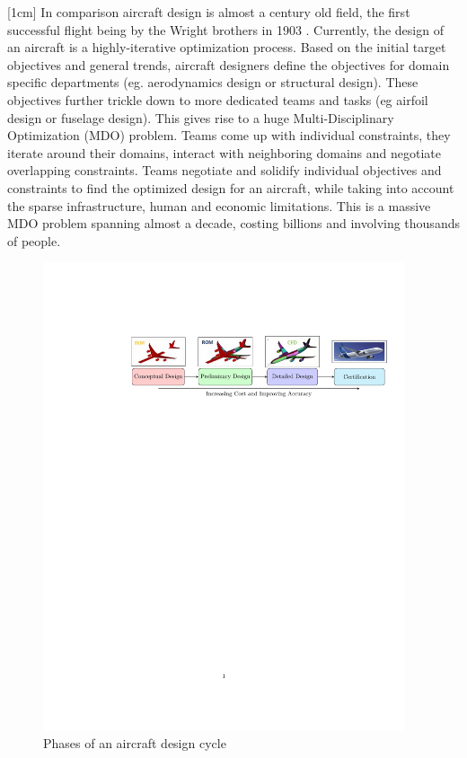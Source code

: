 [1cm]
In comparison aircraft design is almost a century old field, the first successful flight being by the Wright brothers in 1903 \cite{wright1934we}. Currently, the design of an aircraft is a highly-iterative optimization process. Based on the initial target objectives and general trends, aircraft designers define the objectives for domain specific departments (eg. aerodynamics design or structural design). These objectives further trickle down to more dedicated teams and tasks (eg airfoil design or fuselage design). This gives rise to a huge Multi-Disciplinary Optimization (MDO) problem. Teams come up with individual constraints, they iterate around their domains, interact with neighboring domains and negotiate overlapping constraints. Teams negotiate and solidify individual objectives and constraints to find the optimized design for an aircraft, while taking into account the sparse infrastructure, human and economic limitations. This is a massive MDO problem spanning almost a decade, costing billions and involving thousands of people. 

\begin{figure}[!ht]
\label{figPhasesOfAircraftDesign}
  \centering
  
    \includegraphics[clip, trim=4.5cm 19cm 0.5cm 4cm,width=0.95\textwidth]
    {images/part1/aircraftDesignCycleFlowChart}
  
  \caption{Phases of an aircraft design cycle}
\end{figure}

